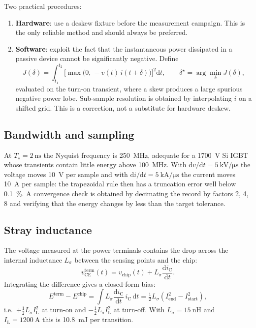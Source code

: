 \documentclass[11pt,a4paper]{article}
\newcommand{\vce}{v_{\mathrm{CE}}}
\newcommand{\ic}{i_{\mathrm{C}}}
\newcommand{\IL}{I_{\mathrm{L}}}
\begin{document}
Two practical procedures:
\begin{enumerate}
\item \textbf{Hardware}: use a deskew fixture before the measurement campaign. This is the
only reliable method and should always be preferred.
\item \textbf{Software}: exploit the fact that the instantaneous power dissipated in a
passive device cannot be significantly negative. Define
\begin{equation}
J(\delta)=\int_{t_1}^{t_2}\big[\max\!\big(0,\,-v(t)\,i(t+\delta)\big)\big]^2\mathrm{d}t,
\qquad \delta^\star=\arg\min_\delta J(\delta),
\label{eq:softdeskew}
\end{equation}
evaluated on the turn-on transient, where a skew produces a large spurious negative
power lobe. Sub-sample resolution is obtained by interpolating $i$ on a shifted grid.
This is a correction, not a substitute for hardware deskew.
\end{enumerate}

\subsection{Bandwidth and sampling}

At $T_s=\SI{2}{\nano\second}$ the Nyquist frequency is \SI{250}{\mega\hertz}, adequate for
a \SI{1700}{\volt} Si IGBT whose transients contain little energy above
\SI{100}{\mega\hertz}. With $\mathrm{d}v/\mathrm{d}t=\SI{5}{\kilo\volt\per\micro\second}$
the voltage moves \SI{10}{\volt} per sample and with
$\mathrm{d}i/\mathrm{d}t=\SI{5}{\kilo\ampere\per\micro\second}$ the current moves
\SI{10}{\ampere} per sample: the trapezoidal rule then has a truncation error well below
\SI{0.1}{\percent}. A convergence check is obtained by decimating the record by factors
2, 4, 8 and verifying that the energy changes by less than the target tolerance.

\subsection{Stray inductance}

The voltage measured at the power terminals contains the drop across the internal
inductance $L_\sigma$ between the sensing points and the chip:
\begin{equation}
\vce^{\mathrm{term}}(t)=v_{\mathrm{chip}}(t)+L_\sigma\frac{\mathrm{d}\ic}{\mathrm{d}t}.
\end{equation}
Integrating the difference gives a closed-form bias:
\begin{equation}
E^{\mathrm{term}}-E^{\mathrm{chip}}
=\int L_\sigma \frac{\mathrm{d}\ic}{\mathrm{d}t}\,\ic \,\mathrm{d}t
=\tfrac{1}{2}L_\sigma\left(I_{\mathrm{end}}^2-I_{\mathrm{start}}^2\right),
\label{eq:Lsigma}
\end{equation}
i.e.\ $+\tfrac{1}{2}L_\sigma \IL^2$ at turn-on and $-\tfrac{1}{2}L_\sigma \IL^2$ at
turn-off. With $L_\sigma=\SI{15}{\nano\henry}$ and $\IL=\SI{1200}{\ampere}$ this is
\SI{10.8}{\milli\joule} per transition.
\end{document}
